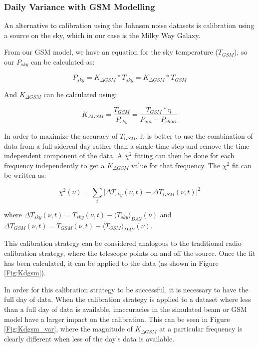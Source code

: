 \subsubsection{Daily Variance with GSM Modelling}

An alternative to calibration using the Johnson noise datasets is calibration using a source on the sky, which in our case is the Milky Way Galaxy. 

From our GSM model, we have an equation for the sky temperature ($T_{GSM}$), so our $P_{sky}$ can be calculated as:

\begin{equation}
P_{sky} = K_{\Delta GSM}*T_{sky} = K_{\Delta GSM} * T_{GSM}
\end{equation}

And $K_{\Delta GSM}$ can be calculated using:

\begin{equation}
K_{\Delta GSM} = \frac{T_{GSM}}{P_{sky}} = \frac{T_{GSM}* \eta}{P_{ant}-P_{short}}
\end{equation}

In order to maximize the accuracy of $T_{GSM}$, it is better to use the combination of data from a full sidereal day rather than a single time step and remove the time independent component of the data. A $\chi^2$ fitting can then be done  for each frequency independently to get a $K_{\Delta GSM}$ value for that frequency. The $\chi^2$ fit can be written as:

\begin{equation}
\chi^2(\nu) =  \sum_t \big [ \Delta T_{sky}(\nu,t) - \Delta T_{GSM}(\nu,t) \big ]^2
\end{equation}

where $\Delta T_{sky} (\nu, t) = T_{sky}(\nu,t)-\langle T_{sky} \rangle_{DAY} (\nu)$ and $\Delta T_{GSM} (\nu,t) = T_{GSM}(\nu,t)-\langle T_{GSM} \rangle_{DAY} (\nu)$. 

This calibration strategy can be considered analogous to the traditional radio calibration strategy, where the telescope points on and off the source. Once the fit has been calculated, it can be applied to the data (as shown in Figure \ref{Fig:Kdgsm}). 


In order for this calibration strategy to be successful, it is necessary to have the full day of data. When the calibration strategy is applied to a dataset where less than a full day of data is available, inaccuracies in the simulated beam or GSM model have a larger impact on the calibration. This can be seen in Figure \ref{Fig:Kdgsm_var}, where the magnitude of $K_{\Delta GSM}$ at a particular frequency is clearly different when less of the day's data is available. 

